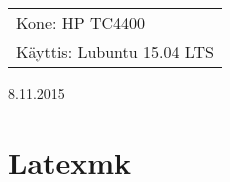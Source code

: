 \documentclass[main.tex]{subfiles}
\begin{document}
\thispagestyle{empty}
\begin{tabular}[t]{l}
Kone: HP TC4400\\
Käyttis: Lubuntu 15.04 LTS
\end{tabular}
\hfill 8.11.2015

{\section{Latexmk}}
\end{document}
